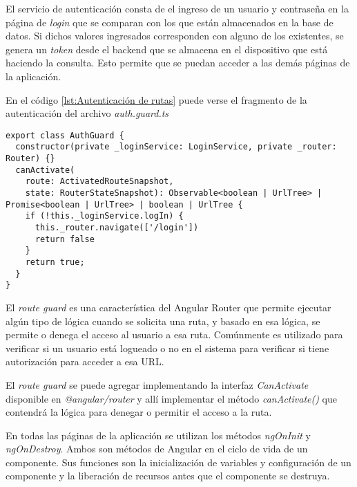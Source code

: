 El servicio de autenticación consta de el ingreso de un usuario y contraseña en la página de \textit{login} que se comparan con los que están almacenados en la base de datos. Si dichos valores ingresados corresponden con alguno de los existentes, se genera un \textit{token} desde el backend que se almacena en el dispositivo que está haciendo la consulta. Esto permite que se puedan acceder a las demás páginas de la aplicación.

En el código \ref{lst:Autenticación de rutas} puede verse el fragmento de la autenticación del archivo \textit{auth.guard.ts}



\begin{lstlisting}[caption={Autenticación de rutas}, label={lst:Autenticación de rutas}]
export class AuthGuard {
  constructor(private _loginService: LoginService, private _router: Router) {}
  canActivate(
    route: ActivatedRouteSnapshot,
    state: RouterStateSnapshot): Observable<boolean | UrlTree> | Promise<boolean | UrlTree> | boolean | UrlTree {
    if (!this._loginService.logIn) {
      this._router.navigate(['/login'])
      return false
    }
    return true;
  }
}
\end{lstlisting}

El \textit{route guard} es una característica del Angular Router que permite ejecutar algún tipo de lógica cuando se solicita una ruta, y basado en esa lógica, se permite o denega el acceso al usuario a esa ruta. Comúnmente es utilizado para verificar si un usuario está logueado o no en el sistema para verificar si tiene autorización para acceder a esa URL.

El \textit{route guard} se puede agregar implementando la interfaz \textit{CanActivate} disponible en \textit{@angular/router} y allí implementar el método \textit{canActivate()} que contendrá la lógica para denegar o permitir el acceso a la ruta.\citep{22}

En todas las páginas de la aplicación se utilizan los métodos \textit{ngOnInit} y \textit{ngOnDestroy}. Ambos son métodos de Angular en el ciclo de vida de un componente. Sus funciones son la inicialización de variables y configuración de un componente y la liberación de recursos antes que el componente se destruya.\citep{23}

